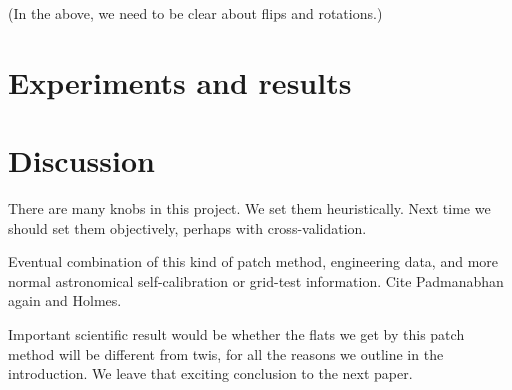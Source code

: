 \documentclass[12pt,preprint,pdftex]{aastex}
\begin{document}
(In the above, we need to be clear about flips and rotations.)

\section{Experiments and results}

\section{Discussion}

There are many knobs in this project.  We set them heuristically.
Next time we should set them objectively, perhaps with
cross-validation.

Eventual combination of this kind of patch method, engineering data,
and more normal astronomical self-calibration or grid-test
information.  Cite Padmanabhan again and Holmes.

Important scientific result would be whether the flats we get by this
patch method will be different from twis, for all the reasons we
outline in the introduction.  We leave that exciting conclusion to the
next paper.
\end{document}
